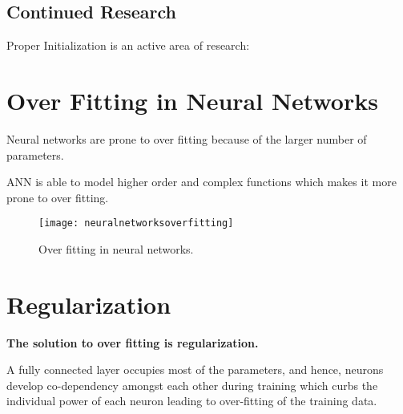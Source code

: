 	\subsection{Continued Research}
Proper Initialization is an active area of research:


	\section{Over Fitting in Neural Networks}

	\begin{bulletedlist}
		\item Neural networks are prone to over fitting because of the larger number of parameters.
		\item ANN is able to model higher order and complex functions which makes it more prone to over fitting.
	\end{bulletedlist}

 	\begin{figure}[h]
		\centering
		\texttt{[image: neuralnetworksoverfitting]}
		\caption[Over fitting in neural networks]{Over fitting in neural networks.}
		\label{fig:neuralnetworksoverfitting}
	\end{figure}

	\section{Regularization}
{\bfseries The solution to over fitting is regularization.}

A fully connected layer occupies most of the parameters, and hence, neurons develop co-dependency amongst each other during training which curbs the individual power of each neuron leading to over-fitting of the training data.

